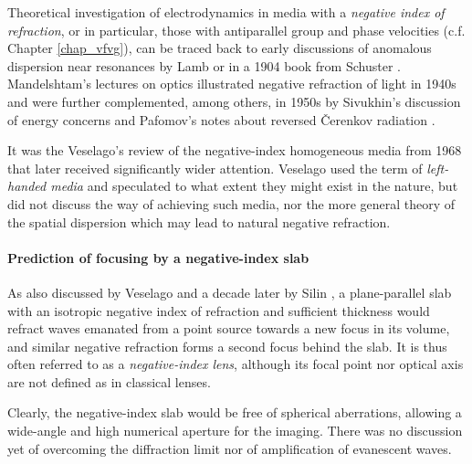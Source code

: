 Theoretical investigation of electrodynamics in media with a \textit{negative index of refraction}, or in particular, those with antiparallel group and phase velocities (c.f. Chapter \ref{chap_vfvg}), can be traced back \cite{agranovich2006spatial} to early discussions of anomalous dispersion near resonances by Lamb or in a 1904 book from Schuster \cite{schuster1904introduction, boardman2005negative}. Mandelshtam's lectures on optics illustrated negative refraction of light in 1940s \cite{mandelstam1971lectures} and were further complemented, among others, in 1950s by Sivukhin's discussion of energy concerns \cite{sivukhin1957energy} and Pafomov's notes about reversed \v{C}erenkov radiation \cite{pafomov1956cerenkov}. 

It was the Veselago's review of the negative-index homogeneous media \cite{veselago1968} from 1968 that later received significantly wider attention. Veselago used %
the term of \textit{left-handed media} and speculated to what extent they might exist in the nature, but did not discuss the way of achieving such media, nor the more general theory of the spatial dispersion which may lead to natural negative refraction.

\paragraph{Prediction of focusing by a negative-index slab} %
As also discussed by Veselago \cite[p. 511]{veselago1968} and a decade later by Silin \cite{silin1978possibility},  %
a plane-parallel slab with an isotropic negative index of refraction and sufficient thickness would refract waves emanated from a point source towards a new focus in its volume, and similar negative refraction forms a second focus behind the slab. It is thus often referred to as a \textit{negative-index lens}, although its focal point nor optical axis are not defined as in classical lenses.

Clearly, the negative-index slab would be free of spherical aberrations, allowing a wide-angle and high numerical aperture for the imaging. There was no discussion yet of overcoming the diffraction limit nor of amplification of evanescent waves.  %

